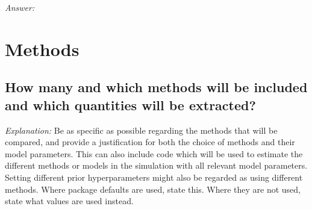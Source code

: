 \documentclass[12pt]{article}
\begin{document}
\textit{Answer:}

\section{Methods}
\subsection{How many and which methods will be included and which quantities will be extracted?}

\textit{Explanation:} Be as specific as possible regarding the methods that will be compared, and provide a justification for both the choice of methods and their model parameters. This can also include code which will be used to estimate the different methods or models in the simulation with all relevant model parameters. Setting different prior hyperparameters might also be regarded as using different methods.  Where package defaults are used, state this. Where they are not used, state what values are used instead.
\end{document}
